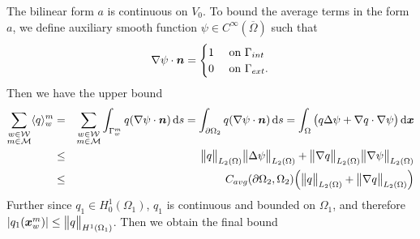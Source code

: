 The bilinear form $a$ is continuous on $V_0$. To bound the average terms in the form $a$,
we define auxiliary smooth function $\psi\in C^{\infty}(\overbar\Omega)$ such that
\begin{equation*}
  \nabla\psi\cdot\mathbf{\boldsymbol{n}} =
  \begin{cases}
    1 & \textrm{ on } \Gamma_{int}\\
    0 & \textrm{ on } \Gamma_{ext}.
  \end{cases} \nonumber
\end{equation*}
Then we have the upper bound
\begin{eqnarray*}
  \sum_{\substack{w\in \mathcal{W} \\ m\in \mathcal{M}}} \langle q\rangle^m_w
    &=& \sum_{\substack{w\in \mathcal{W} \\ m\in \mathcal{M}}} \int_{\Gamma^m_w} q (\nabla\psi\cdot\mathbf{\boldsymbol{n}}) \,{\rm d} s
    = \int_{\partial\Omega_2} q (\nabla\psi\cdot\mathbf{\boldsymbol{n}}) \,{\rm d} s
    = \int_{\Omega} \big(q \Delta\psi + \nabla q \cdot\nabla\psi \big) \,{\rm d}\mathbf{\boldsymbol{x}} \\
    &\leq& \bigl\Vert q\bigr\Vert_{L_2(\Omega)}\bigl\Vert\Delta\psi\bigr\Vert_{L_2(\Omega)} + \bigl\Vert\nabla q\bigr\Vert_{L_2(\Omega)} \bigl\Vert\nabla\psi\bigr\Vert_{L_2(\Omega)} \\
    &\leq& C_{avg}(\partial\Omega_2, \Omega_2) \Big(\bigl\Vert q\bigr\Vert_{L_2(\Omega)} + \bigl\Vert\nabla q\bigr\Vert_{L_2(\Omega)}\Big)
\end{eqnarray*}
Further since $q_1\in H^1_0(\Omega_1)$, $q_1$ is continuous and bounded on $\Omega_1$, and therefore $\left|q_1(\mathbf{\boldsymbol{x}}^m_w)\right|\leq \bigl\Vert q\bigr\Vert_{H^1(\Omega_1)}$.
Then we obtain the final bound
